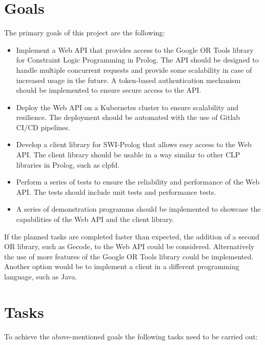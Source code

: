 \documentclass[en]{customTemplate}
\begin{document}

\clearpage

\section{Goals}

The primary goals of this project are the following:

\begin{itemize}
    \item Implement a Web API that provides access to the Google OR Tools library for Constraint Logic Programming in Prolog. The API should be designed to handle multiple concurrent requests and provide some scalability in case of increased usage in the future. A token-based authentication mechanism should be implemented to ensure secure access to the API.
    \item Deploy the Web API on a Kubernetes cluster to ensure scalability and resilience. The deployment should be automated with the use of Gitlab CI/CD pipelines.
    \item Develop a client library for SWI-Prolog that allows easy access to the Web API. The client library should be usable in a way similar to other CLP libraries in Prolog, such as clpfd.
    \item Perform a series of tests to ensure the reliability and performance of the Web API. The tests should include unit tests and performance tests.
    \item A series of demonstration programms should be implemented to showcase the capabilities of the Web API and the client library.
\end{itemize}

If the planned tasks are completed faster than expected, the addition of a second OR library, such as Gecode, to the Web API could be considered. Alternatively the use of more features of the Google OR Tools library could be implemented. Another option would be to implement a client in a different programming language, such as Java.

\clearpage

\section{Tasks}

To achieve the above-mentioned goals the following tasks need to be carried out:
\end{document}
